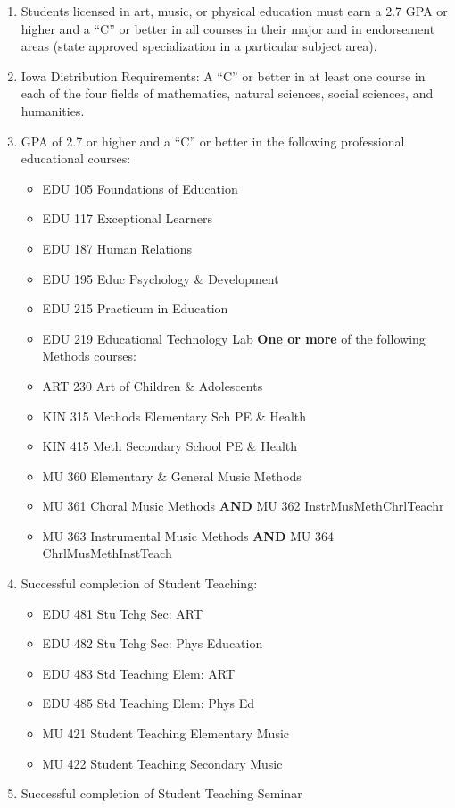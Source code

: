 \documentclass[
  letterpaper,
]{scrbook}
\providecommand{\tightlist}{%
  \setlength{\itemsep}{0pt}\setlength{\parskip}{0pt}}
\begin{document}
\begin{enumerate}
\def\labelenumi{\arabic{enumi}.}
\tightlist
\item
  Students licensed in art, music, or physical education must earn a 2.7
  GPA or higher and a ``C'' or better in all courses in their major and
  in endorsement areas (state approved specialization in a particular
  subject area).
\item
  Iowa Distribution Requirements: A ``C'' or better in at least one
  course in each of the four fields of mathematics, natural sciences,
  social sciences, and humanities.
\item
  GPA of 2.7 or higher and a ``C'' or better in the following
  professional educational courses:

  \begin{itemize}
  \tightlist
  \item
    EDU 105 Foundations of Education
  \item
    EDU 117 Exceptional Learners
  \item
    EDU 187 Human Relations
  \item
    EDU 195 Educ Psychology \& Development
  \item
    EDU 215 Practicum in Education
  \item
    EDU 219 Educational Technology Lab \textbf{One or more} of the
    following Methods courses:
  \item
    ART 230 Art of Children \& Adolescents
  \item
    KIN 315 Methods Elementary Sch PE \& Health
  \item
    KIN 415 Meth Secondary School PE \& Health
  \item
    MU 360 Elementary \& General Music Methods
  \item
    MU 361 Choral Music Methods \textbf{AND} MU 362
    InstrMusMethChrlTeachr
  \item
    MU 363 Instrumental Music Methods \textbf{AND} MU 364
    ChrlMusMethInstTeach
  \end{itemize}
\item
  Successful completion of Student Teaching:

  \begin{itemize}
  \tightlist
  \item
    EDU 481 Stu Tchg Sec: ART
  \item
    EDU 482 Stu Tchg Sec: Phys Education
  \item
    EDU 483 Std Teaching Elem: ART
  \item
    EDU 485 Std Teaching Elem: Phys Ed
  \item
    MU 421 Student Teaching Elementary Music
  \item
    MU 422 Student Teaching Secondary Music
  \end{itemize}
\item
  Successful completion of Student Teaching Seminar


\end{enumerate}
\end{document}
